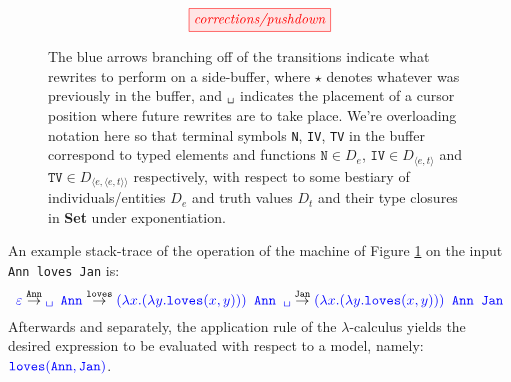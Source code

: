 \clearpage

\begin{figure}\label{fig:corrpush}
\centering
\[\tikzfig{corrections/pushdown}\]
\caption{
The blue arrows branching off of the transitions indicate what rewrites to perform on a side-buffer, where $\star$ denotes whatever was previously in the buffer, and $\texttt{\textvisiblespace}$ indicates the placement of a cursor position where future rewrites are to take place. We're overloading notation here so that terminal symbols \texttt{N}, \texttt{IV}, \texttt{TV} in the buffer correspond to typed elements and functions $\texttt{N} \in D_e$, $\texttt{IV} \in D_{\langle e,t \rangle}$ and $\texttt{TV} \in D_{\langle e, \langle e , t \rangle \rangle}$ respectively, with respect to some bestiary of individuals/entities $D_e$ and truth values $D_t$ and their type closures in \textbf{Set} under exponentiation.
}
\end{figure}
\begin{example}
An example stack-trace of the operation of the machine of Figure \ref{fig:corrpush} on the input \texttt{Ann loves Jan} is:
\[
\textcolor{blue}{\varepsilon}
\overset{\texttt{Ann}}{\rightarrow}
\textcolor{blue}{\texttt{\textvisiblespace} \texttt{ Ann}}
\overset{\texttt{loves}}{\rightarrow}
\textcolor{blue}{(\lambda x. (\lambda y. \texttt{loves}(x,y)))\texttt{ Ann \textvisiblespace}}
\overset{\texttt{Jan}}{\rightarrow}
\textcolor{blue}{(\lambda x. (\lambda y. \texttt{loves}(x,y)))\texttt{ Ann Jan}}
\]
Afterwards and separately, the application rule of the $\lambda$-calculus yields the desired expression to be evaluated with respect to a model, namely: $\textcolor{blue}{\texttt{loves}(\texttt{Ann},\texttt{Jan})}$.
\end{example}
